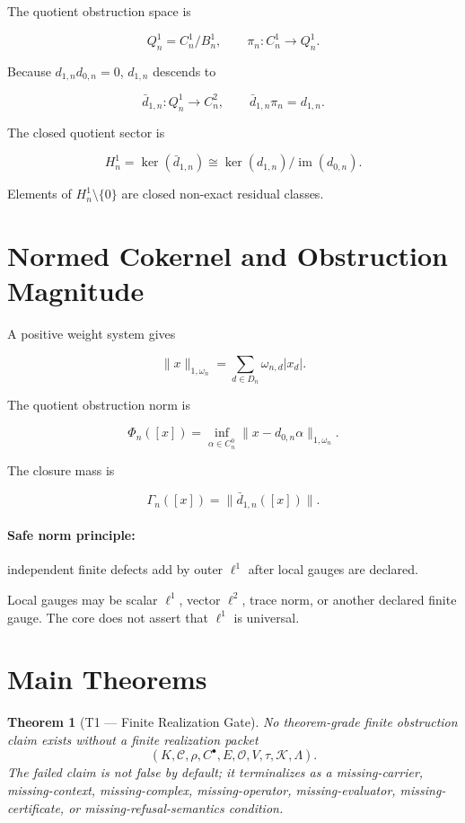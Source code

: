 \documentclass[11pt]{article}
\newtheorem{theorem}{Theorem}[section]
\theoremstyle{definition}
\begin{document}
The quotient obstruction space is

\[
Q^1_n=C^1_n/B^1_n,
\qquad
\pi_n:C^1_n\to Q^1_n.
\]

Because \(d_{1,n}d_{0,n}=0\), \(d_{1,n}\) descends to

\[
\bar d_{1,n}:Q^1_n\to C^2_n,
\qquad
\bar d_{1,n}\pi_n=d_{1,n}.
\]

The closed quotient sector is

\[
H^1_n=\ker(\bar d_{1,n})\cong\ker(d_{1,n})/\operatorname{im}(d_{0,n}).
\]

Elements of \(H^1_n\setminus\{0\}\) are closed non-exact residual classes.

\section{Normed Cokernel and Obstruction Magnitude}

A positive weight system gives

\[
\|x\|_{1,\omega_n}=\sum_{d\in D_n}\omega_{n,d}|x_d|.
\]

The quotient obstruction norm is

\[
\Phi_n([x])=\inf_{\alpha\in C^0_n}\|x-d_{0,n}\alpha\|_{1,\omega_n}.
\]

The closure mass is

\[
\Gamma_n([x])=\|\bar d_{1,n}([x])\|.
\]

\paragraph{Safe norm principle:} independent finite defects add by outer \(\ell^1\) after local gauges are declared.

Local gauges may be scalar \(\ell^1\), vector \(\ell^2\), trace norm, or another declared finite gauge. The core does not assert that \(\ell^1\) is universal.

\section{Main Theorems}

\begin{theorem}[T1 — Finite Realization Gate]
No theorem-grade finite obstruction claim exists without a finite realization packet
\[
(K,\mathcal C,\rho,C^\bullet,E,\mathcal O,V,\tau,\mathcal K,\Lambda).
\]
The failed claim is not false by default; it terminalizes as a missing-carrier, missing-context, missing-complex, missing-operator, missing-evaluator, missing-certificate, or missing-refusal-semantics condition.
\end{theorem}
\end{document}
